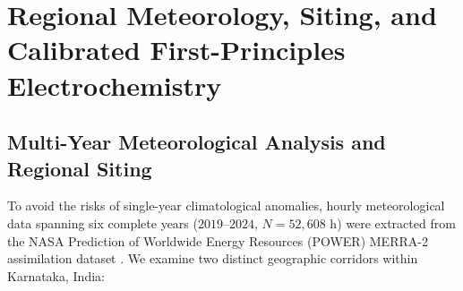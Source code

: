 \documentclass[conference]{IEEEtran}
\begin{document}
\section{Regional Meteorology, Siting, and Calibrated First-Principles Electrochemistry}

\subsection{Multi-Year Meteorological Analysis and Regional Siting}
To avoid the risks of single-year climatological anomalies, hourly meteorological data spanning six complete years ($2019$--$2024$, $N = 52,608\text{ h}$) were extracted from the NASA Prediction of Worldwide Energy Resources (POWER) MERRA-2 assimilation dataset \cite{nasapower2026}. We examine two distinct geographic corridors within Karnataka, India:
\end{document}
